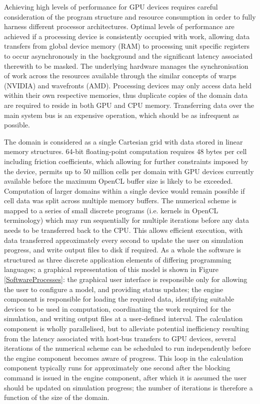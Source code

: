 Achieving high levels of performance for GPU devices requires careful consideration of the program structure and resource consumption in order to fully harness different processor architectures. Optimal levels of performance are achieved if a processing device is consistently occupied with work, allowing data transfers from global device memory (RAM) to processing unit specific registers to occur asynchronously in the background and the significant latency associated therewith to be masked. The underlying hardware manages the synchronisation of work across the resources available through the similar concepts of warps (NVIDIA) and wavefronts (AMD). Processing devices may only access data held within their own respective memories, thus duplicate copies of the domain data are required to reside in both GPU and CPU memory. Transferring data over the main system bus is an expensive operation, which should be as infrequent as possible.

The domain is considered as a single Cartesian grid with data stored in linear memory structures. 64-bit floating-point computation requires 48 bytes per cell including friction coefficients, which allowing for further constraints imposed by the device, permits up to 50 million cells per domain with GPU devices currently available before the maximum OpenCL buffer size is likely to be exceeded. Computation of larger domains within a single device would remain possible if cell data was split across multiple memory buffers. The numerical scheme is mapped to a series of small discrete programs (i.e. kernels in OpenCL terminology) which may run sequentially for multiple iterations before any data needs to be transferred back to the CPU. This allows efficient execution, with data transferred approximately every second to update the user on simulation progress, and write output files to disk if required. As a whole the software is structured as three discrete application elements of differing programming languages; a graphical representation of this model is shown in Figure \ref{SoftwareProcesses}: the graphical user interface is responsible only for allowing the user to configure a model, and providing status updates; the engine component is responsible for loading the required data, identifying suitable devices to be used in computation, coordinating the work required for the simulation, and writing output files at a user-defined interval. The calculation component is wholly parallelised, but to alleviate potential inefficiency resulting from the latency associated with host-bus transfers to GPU devices, several iterations of the numerical scheme can be scheduled to run independently before the engine component becomes aware of progress. This loop in the calculation component typically runs for approximately one second after the blocking command is issued in the engine component, after which it is assumed the user should be updated on simulation progress; the number of iterations is therefore a function of the size of the domain.

